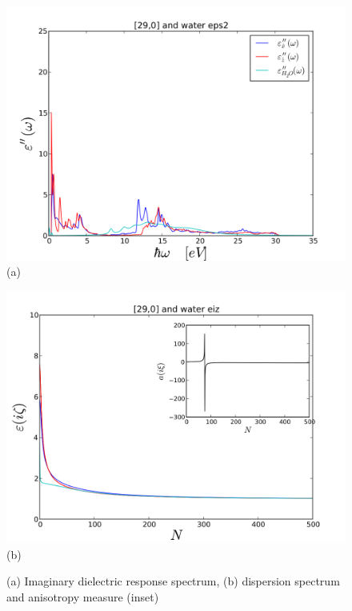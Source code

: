 \documentclass[a4paper]{article}
\begin{document}
\begin{center}
\begin{figure}[t!]
\begin{center}
\begin{minipage}[b]{0.40\textwidth}
\begin{center}
\includegraphics[width=1.4\textwidth]{prop_plots/290w290_eps2.png} (a)
\end{center}
\end{minipage}
\hskip 43pt
\begin{minipage}[b]{0.40\textwidth}
\begin{center}
\includegraphics[width=1.4\textwidth]{prop_plots/290w290_eiz.png} (b)
\end{center}
\end{minipage}
\caption{(a) Imaginary dielectric response spectrum, (b) dispersion spectrum and anisotropy measure (inset)}
\label{eiz290}
\end{center}
\end{figure} 


\end{center}
\end{document}
